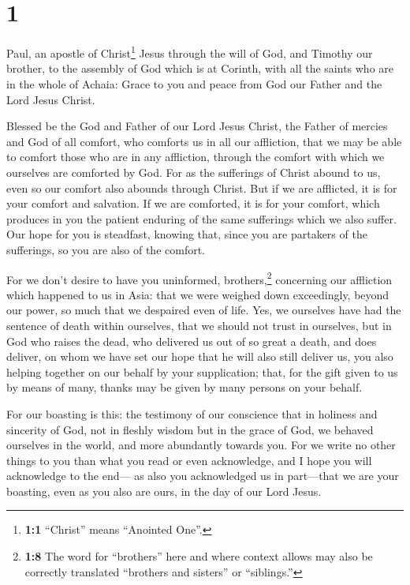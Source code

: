 \hypertarget{section}{%
\section{1}\label{section}}

 Paul, an apostle of Christ\footnote{\textbf{1:1}
  ``Christ'' means ``Anointed One''.} Jesus through the will of God, and
Timothy our brother, to the assembly of God which is at Corinth, with
all the saints who are in the whole of Achaia:  Grace to
you and peace from God our Father and the Lord Jesus Christ.

 Blessed be the God and Father of our Lord Jesus Christ,
the Father of mercies and God of all comfort,  who
comforts us in all our affliction, that we may be able to comfort those
who are in any affliction, through the comfort with which we ourselves
are comforted by God.  For as the sufferings of Christ
abound to us, even so our comfort also abounds through Christ.
 But if we are afflicted, it is for your comfort and
salvation. If we are comforted, it is for your comfort, which produces
in you the patient enduring of the same sufferings which we also suffer.
 Our hope for you is steadfast, knowing that, since you
are partakers of the sufferings, so you are also of the comfort.

 For we don't desire to have you uninformed,
brothers,\footnote{\textbf{1:8} The word for ``brothers'' here and where
  context allows may also be correctly translated ``brothers and
  sisters'' or ``siblings.''} concerning our affliction which happened
to us in Asia: that we were weighed down exceedingly, beyond our power,
so much that we despaired even of life.  Yes, we ourselves
have had the sentence of death within ourselves, that we should not
trust in ourselves, but in God who raises the dead,  who
delivered us out of so great a death, and does deliver, on whom we have
set our hope that he will also still deliver us,  you
also helping together on our behalf by your supplication; that, for the
gift given to us by means of many, thanks may be given by many persons
on your behalf.

 For our boasting is this: the testimony of our
conscience that in holiness and sincerity of God, not in fleshly wisdom
but in the grace of God, we behaved ourselves in the world, and more
abundantly towards you.  For we write no other things to
you than what you read or even acknowledge, and I hope you will
acknowledge to the end---  as also you acknowledged us in
part---that we are your boasting, even as you also are ours, in the day
of our Lord Jesus.

